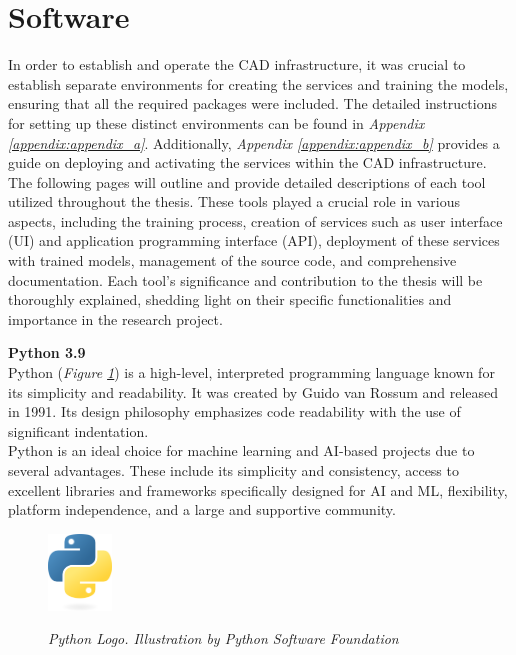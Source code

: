 \section{Software}

In order to establish and operate the CAD infrastructure, it was crucial to establish separate environments for creating the services and training the models, ensuring that all the required packages were included. The detailed instructions for setting up these distinct environments can be found in \textit{Appendix \ref{appendix:appendix_a}}. Additionally, \textit{Appendix \ref{appendix:appendix_b}} provides a guide on deploying and activating the services within the CAD infrastructure. \\

The following pages will outline and provide detailed descriptions of each tool utilized throughout the thesis. These tools played a crucial role in various aspects, including the training process, creation of services such as user interface (UI) and application programming interface (API), deployment of these services with trained models, management of the source code, and comprehensive documentation. Each tool's significance and contribution to the thesis will be thoroughly explained, shedding light on their specific functionalities and importance in the research project.  

\newpage

\vspace{0.5cm}
\textbf{Python 3.9} \\

Python (\textit{Figure \ref{fig:python-logo}}) is a high-level, interpreted programming language known for its simplicity and readability. It was created by Guido van Rossum and released in 1991. Its design philosophy emphasizes code readability with the use of significant indentation. \\ 

Python is an ideal choice for machine learning and AI-based projects due to several advantages. These include its simplicity and consistency, access to excellent libraries and frameworks specifically designed for AI and ML, flexibility, platform independence, and a large and supportive community.

\begin{figure}[H]
\centering
\includegraphics[width=0.15\textwidth]{imatges/studies_and_decisions/python-logo-only.png}
\caption[Python Logo]{\textit{Python Logo. Illustration by Python Software Foundation}}
{\label{fig:python-logo}}
\end{figure}

